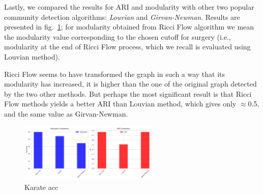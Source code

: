 Lastly, we compared the results for ARI and modularity with other two popular community detection algorithms: \textit{Louvian} and \textit{Girvan-Newman}. Results are presented in fig.~\ref{fig:Karate_Comparison}; for modularity obtained from Ricci Flow algorithm we mean the modularity value corresponding to the chosen cutoff for surgery (i.e., modularity at the end of Ricci Flow process, which we recall is evaluated using Louvian method). 

Ricci Flow seems to have transformed the graph in such a way that its modularity has increased, it is higher than the one of the original graph detected by the two other methods. But perhaps the most significant result is that Ricci Flow methods yields a better ARI than Louvian method, which gives only $\approx$0.5, and the same value as Girvan-Newman.
\begin{figure}
    \centering
    \includegraphics[width=0.6\textwidth]{../KarateClubResults/Comparison.png}
    \caption{Karate acc}
    \label{fig:Karate_Comparison}
\end{figure}